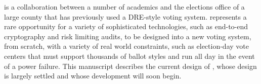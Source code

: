 \projname is a collaboration between a number of academics and
the elections office of a large county that has previously used a DRE-style
voting system. \projname represents a rare opportunity for a variety of
sophisticated technologies, such as end-to-end cryptography and risk limiting
audits, to be designed into a new voting system, from scratch, with
a variety of real world constraints, such as election-day vote centers
that must support thousands of ballot styles and run
all day in the event of a power failure. This manuscript describes the
current design of \projname, whose design is largely settled and whose
development will soon begin.

